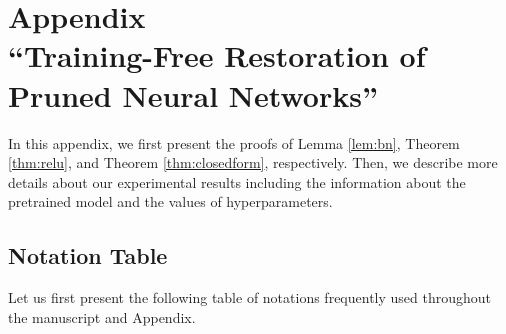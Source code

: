 \onecolumn

\section*{Appendix \\``Training-Free Restoration of Pruned Neural Networks''} \label{sec:supp}


\setcounter{table}{0}
\setcounter{figure}{0}

\renewcommand{\thetable}{A\arabic{table}}  
\renewcommand{\thefigure}{A\arabic{figure}}
\renewcommand{\thesubsection}{A\arabic{subsection}}

In this appendix, we first present the proofs of Lemma \ref{lem:bn}, Theorem \ref{thm:relu}, and Theorem \ref{thm:closedform}, respectively. Then, we describe more details about our experimental results including the information about the pretrained model and the values of hyperparameters.

\subsection{Notation Table}
Let us first present the following table of notations frequently used throughout the manuscript and Appendix.

